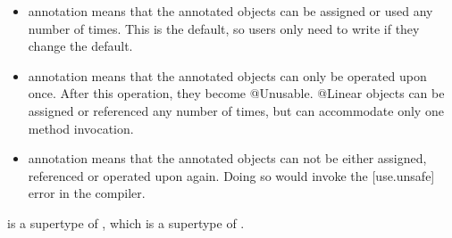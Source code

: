 \begin{itemize}
\item
{} annotation means that the annotated objects can be assigned or used any number of times.  This is the default, so users only
need to write  if they change the default.
\item
{} annotation means that the annotated objects can only be operated upon once. After this operation, they become @Unusable.
@Linear objects can be assigned or referenced any number of times, but can accommodate only one method invocation.
\item
{} annotation means that the annotated objects can not be either assigned, referenced or operated upon again.
Doing so would invoke the [use.unsafe] error in the compiler.
\end{itemize}

\noindent
{} is a supertype of , which is a
supertype of .
